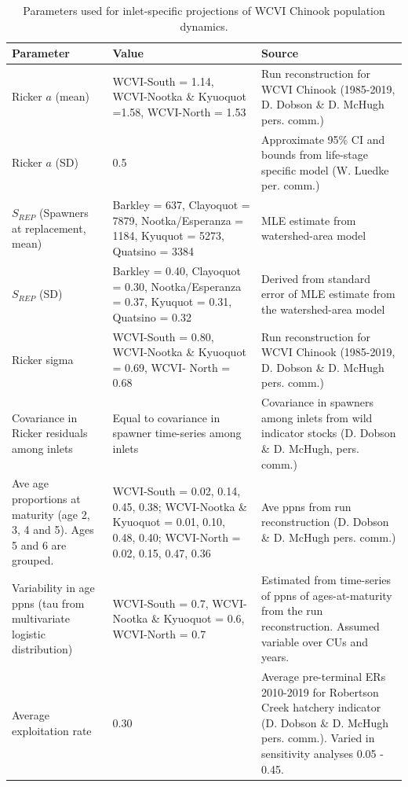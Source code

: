 \documentclass[11pt]{book}
\begin{document}
\renewcommand*{\arraystretch}{1.6}
\begin{longtable}[]{p{3.7cm} p{5cm} p{6.3cm}}
\caption{Parameters used for inlet-specific projections of WCVI Chinook population dynamics.}\\
\hline
Parameter & Value & Source \\ 
\hline
\endhead
Ricker $a$ (mean)  &  WCVI-South = 1.14, WCVI-Nootka \& Kyuoquot =1.58, WCVI-North = 1.53 & Run reconstruction for WCVI Chinook (1985-2019, D. Dobson \& D. McHugh pers. comm.)\\

Ricker $a$ (SD) & 0.5 &  Approximate 95\% CI and bounds from life-stage specific model (W. Luedke per. comm.)\\
$S_{REP}$ (Spawners at replacement, mean) & Barkley = 637, Clayoquot = 7879, Nootka/Esperanza = 1184, Kyuquot = 5273, Quatsino = 3384 & MLE estimate from watershed-area model \\

$S_{REP}$ (SD) & Barkley = 0.40, Clayoquot = 0.30, Nootka/Esperanza = 0.37, Kyuquot = 0.31, Quatsino = 0.32 & Derived from standard error of MLE estimate from the watershed-area model \\

Ricker sigma & WCVI-South = 0.80, WCVI-Nootka \& Kyuoquot = 0.69, WCVI- North = 0.68 & Run reconstruction for WCVI Chinook (1985-2019, D. Dobson \& D. McHugh pers. comm.)\\

Covariance in Ricker residuals among inlets & Equal to covariance in spawner time-series among inlets & Covariance in spawners among inlets from wild indicator stocks (D. Dobson \& D. McHugh, pers. comm.) \\ 

 Ave age proportions at maturity (age 2, 3, 4 and 5). Ages 5 and 6 are grouped. &  WCVI-South = 0.02, 0.14, 0.45, 0.38; WCVI-Nootka \& Kyuoquot = 0.01, 0.10, 0.48, 0.40; WCVI-North = 0.02, 0.15, 0.47, 0.36 & Ave ppns from run reconstruction (D. Dobson \& D. McHugh pers. comm.) \\ 

 Variability in age ppns (tau from multivariate logistic distribution)  & WCVI-South = 0.7, WCVI-Nootka \& Kyuoquot = 0.6, WCVI-North = 0.7 & Estimated from time-series of ppns of ages-at-maturity from the run reconstruction. Assumed variable over CUs and years. \\

 Average exploitation rate & 0.30 & Average pre-terminal ERs 2010-2019 for Robertson Creek hatchery indicator (D. Dobson \& D. McHugh pers. comm.). Varied in sensitivity analyses 0.05 - 0.45.\\


\end{longtable}
\end{document}
